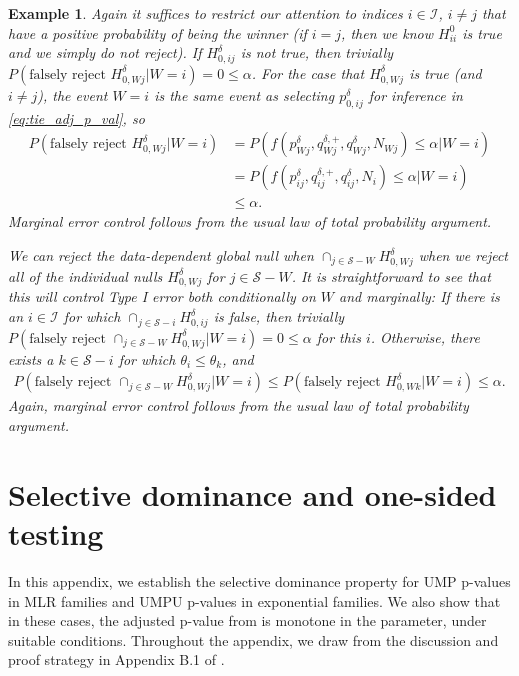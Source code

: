 \documentclass{article}
\newtheorem{example}{Example}
\begin{document}
\begin{appendix}
\begin{example}
    Again it suffices to restrict our attention to indices $i \in \mathcal{I}$, $i \neq j$ that have a positive probability of being the winner (if $i=j$, then we know $H^0_{ii}$ is true and we simply do not reject). If $H^{\delta}_{0, ij}$ is not true, then trivially $P(\text{falsely reject } H^{\delta}_{0, Wj}| W= i) = 0 \leq \alpha$. For the case that $H^{\delta}_{0, Wj}$ is true (and $i \neq j$), the event $W=i$ is the same event as selecting $p_{0, ij}^{\delta}$ for inference in \eqref{eq:tie_adj_p_val}, so 
    \begin{align*}
        P(\text{falsely reject } H^{\delta}_{0, Wj}| W= i) &= P(f(p^{\delta}_{Wj}, q^{\delta, +}_{Wj}, q^{\delta}_{Wj}, N_{Wj}) \leq \alpha | W= i) \\
        &= P(f(p^{\delta}_{ij}, q^{\delta, +}_{ij}, q^{\delta}_{ij}, N_i) \leq \alpha | W = i) \\
        &\leq \alpha. 
    \end{align*}
    Marginal error control follows from the usual law of total probability argument.

    We can reject the data-dependent global null when  $\cap_{j \in \mathcal{S} - W} H^{\delta}_{0, Wj}$ when we reject all of the individual nulls $H^{\delta}_{0, Wj}$ for $j \in \mathcal{S} - W$. It is straightforward to see that this will control Type I error both conditionally on $W$ and marginally: If there is an $i \in \mathcal{I}$ for which $\cap_{j \in \mathcal{S} - i} H^{\delta}_{0, ij}$ is false, then trivially $P(\text{falsely reject } \cap_{j \in \mathcal{S} - W} H^{\delta}_{0, Wj}| W= i) = 0 \leq \alpha$ for this $i$. Otherwise, there exists a $k \in \mathcal{S} - i$ for which $\theta_i \leq \theta_k$, and 
    \begin{align*}
        P(\text{falsely reject } \cap_{j \in \mathcal{S} - W} H^{\delta}_{0, Wj}| W= i) \leq P(\text{falsely reject } H^{\delta}_{0, Wk}| W= i) \leq \alpha.\
    \end{align*} 
    Again, marginal error control follows from the usual law of total probability argument.
\end{example}

\section{Selective dominance and one-sided testing}
\label{sec:one_sided_appdx}

In this appendix, we establish the selective dominance property for UMP p-values in MLR families and UMPU p-values in exponential families. We also show that in these cases, the adjusted p-value from  is monotone in the parameter, under suitable conditions. Throughout the appendix, we draw from the discussion and proof strategy in Appendix B.1 of \cite{Lei}.


\end{appendix}
\end{document}
